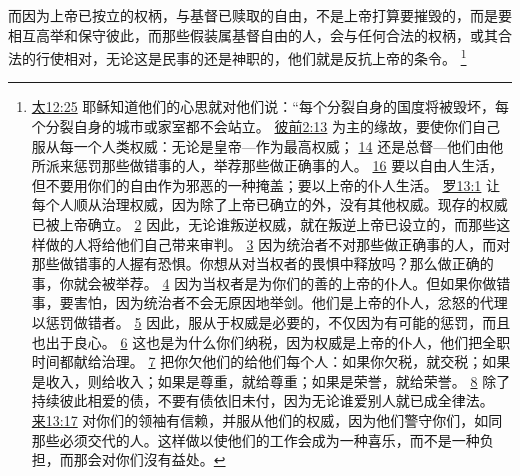 \documentclass[12pt, a4paper, oneside]{ctexart}
\newcounter{parnum}[section]
\newcommand{\N}{%
   \noindent\refstepcounter{parnum}%
    \makebox[\parindent][l]{\textbf{\arabic{parnum}.}}}
\begin{document}
\N 而因为上帝已按立的权柄，与基督已赎取的自由，不是上帝打算要摧毁的，而是要相互高举和保守彼此，而那些假装属基督自由的人，会与任何合法的权柄，或其合法的行使相对，无论这是民事的还是神职的，他们就是反抗上帝的条令。
	\footnote {
		\href{https://biblehub.com/matthew/12-25.htm}{太12:25} 耶稣知道他们的心思就对他们说：“每个分裂自身的国度将被毁坏，每个分裂自身的城市或家室都不会站立。
		\href{https://biblehub.com/1_peter/2-13.htm}{彼前2:13} 为主的缘故，要使你们自己服从每一个人类权威：无论是皇帝---作为最高权威；
		\href{https://biblehub.com/1_peter/2-14.htm}{14} 还是总督---他们由他所派来惩罚那些做错事的人，举荐那些做正确事的人。
		\href{https://biblehub.com/1_peter/2-16.htm}{16} 要以自由人生活，但不要用你们的自由作为邪恶的一种掩盖；要以上帝的仆人生活。
		\href{https://biblehub.com/romans/13-1.htm}{罗13:1} 让每个人顺从治理权威，因为除了上帝已确立的外，没有其他权威。现存的权威已被上帝确立。
		\href{https://biblehub.com/romans/13-2.htm}{2} 因此，无论谁叛逆权威，就在叛逆上帝已设立的，而那些这样做的人将给他们自己带来审判。
		\href{https://biblehub.com/romans/13-3.htm}{3} 因为统治者不对那些做正确事的人，而对那些做错事的人握有恐惧。你想从对当权者的畏惧中释放吗？那么做正确的事，你就会被举荐。
		\href{https://biblehub.com/romans/13-4.htm}{4} 因为当权者是为你们的善的上帝的仆人。但如果你做错事，要害怕，因为统治者不会无原因地举剑。他们是上帝的仆人，忿怒的代理以惩罚做错者。
		\href{https://biblehub.com/romans/13-5.htm}{5} 因此，服从于权威是必要的，不仅因为有可能的惩罚，而且也出于良心。
		\href{https://biblehub.com/romans/13-6.htm}{6} 这也是为什么你们纳税，因为权威是上帝的仆人，他们把全职时间都献给治理。
		\href{https://biblehub.com/romans/13-7.htm}{7} 把你欠他们的给他们每个人：如果你欠税，就交税；如果是收入，则给收入；如果是尊重，就给尊重；如果是荣誉，就给荣誉。
		\href{https://biblehub.com/romans/13-8.htm}{8} 除了持续彼此相爱的债，不要有债依旧未付，因为无论谁爱别人就已成全律法。
		\href{https://biblehub.com/hebrews/13-17.htm}{来13:17} 对你们的领袖有信赖，并服从他们的权威，因为他们警守你们，如同那些必须交代的人。这样做以使他们的工作会成为一种喜乐，而不是一种负担，而那会对你们沒有益处。
	}
\end{document}
